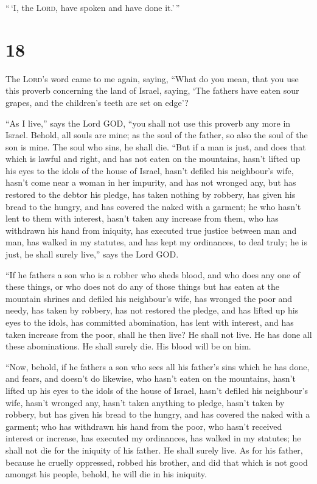 ``\,`I, the \textsc{Lord}, have spoken and have done it.'\,''

\hypertarget{section-17}{%
\section{18}\label{section-17}}

 The \textsc{Lord}'s word came to me again, saying,
 ``What do you mean, that you use this proverb concerning
the land of Israel, saying, `The fathers have eaten sour grapes, and the
children's teeth are set on edge'?

 ``As I live,'' says the Lord GOD, ``you shall not use
this proverb any more in Israel.  Behold, all souls are
mine; as the soul of the father, so also the soul of the son is mine.
The soul who sins, he shall die.  ``But if a man is just,
and does that which is lawful and right,  and has not
eaten on the mountains, hasn't lifted up his eyes to the idols of the
house of Israel, hasn't defiled his neighbour's wife, hasn't come near a
woman in her impurity,  and has not wronged any, but has
restored to the debtor his pledge, has taken nothing by robbery, has
given his bread to the hungry, and has covered the naked with a garment;
 he who hasn't lent to them with interest, hasn't taken
any increase from them, who has withdrawn his hand from iniquity, has
executed true justice between man and man,  has walked in
my statutes, and has kept my ordinances, to deal truly; he is just, he
shall surely live,'' says the Lord GOD.

 ``If he fathers a son who is a robber who sheds blood,
and who does any one of these things,  or who does not do
any of those things but has eaten at the mountain shrines and defiled
his neighbour's wife,  has wronged the poor and needy,
has taken by robbery, has not restored the pledge, and has lifted up his
eyes to the idols, has committed abomination,  has lent
with interest, and has taken increase from the poor, shall he then live?
He shall not live. He has done all these abominations. He shall surely
die. His blood will be on him.

 ``Now, behold, if he fathers a son who sees all his
father's sins which he has done, and fears, and doesn't do likewise,
 who hasn't eaten on the mountains, hasn't lifted up his
eyes to the idols of the house of Israel, hasn't defiled his neighbour's
wife,  hasn't wronged any, hasn't taken anything to
pledge, hasn't taken by robbery, but has given his bread to the hungry,
and has covered the naked with a garment;  who has
withdrawn his hand from the poor, who hasn't received interest or
increase, has executed my ordinances, has walked in my statutes; he
shall not die for the iniquity of his father. He shall surely live.
 As for his father, because he cruelly oppressed, robbed
his brother, and did that which is not good amongst his people, behold,
he will die in his iniquity.


